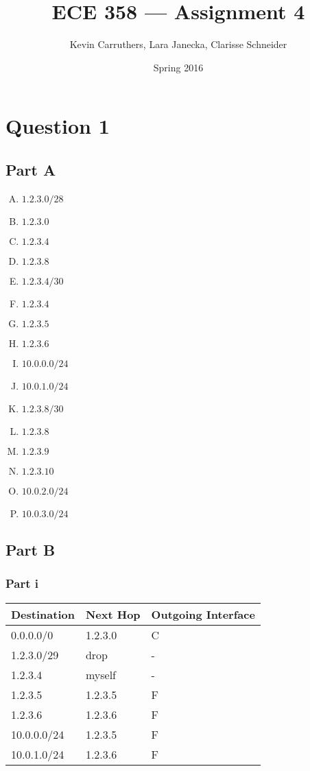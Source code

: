 \documentclass[12pt]{article}
\begin{document}
\title{ECE 358 --- Assignment 4}
\author{Kevin Carruthers, Lara Janecka, Clarisse Schneider}
\date{\vspace{-2ex}Spring 2016}
\maketitle\HRule

\section*{Question 1}
\subsection*{Part A}
\begin{enumerate}[A.]
\item $1.2.3.0/28$
\item $1.2.3.0$
\item $1.2.3.4$
\item $1.2.3.8$
\item $1.2.3.4/30$
\item $1.2.3.4$
\item $1.2.3.5$
\item $1.2.3.6$
\item $10.0.0.0/24$
\item $10.0.1.0/24$
\item $1.2.3.8/30$
\item $1.2.3.8$
\item $1.2.3.9$
\item $1.2.3.10$
\item $10.0.2.0/24$
\item $10.0.3.0/24$
\end{enumerate}

\subsection*{Part B}
\subsubsection*{Part i}
\begin{table}[ht]
\centering
\begin{tabular}{l|l|l}
Destination & Next Hop & Outgoing Interface \\ \hline
0.0.0.0/0   & 1.2.3.0  & C                  \\
1.2.3.0/29  & drop     & -                  \\
1.2.3.4     & myself   & -                  \\
1.2.3.5     & 1.2.3.5  & F                  \\
1.2.3.6     & 1.2.3.6  & F                  \\
10.0.0.0/24 & 1.2.3.5  & F                  \\
10.0.1.0/24 & 1.2.3.6  & F                  \\
\end{tabular}
\end{table}
\end{document}
